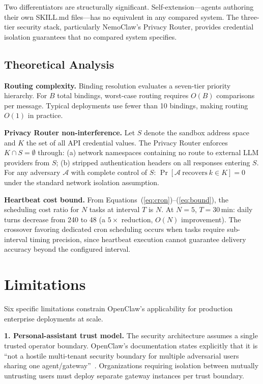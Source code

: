 \documentclass[journal]{IEEEtran}
\begin{document}
Two differentiators are structurally significant. Self-extension---agents
authoring their own SKILL.md files---has no equivalent in any compared system.
The three-tier security stack, particularly NemoClaw's Privacy Router, provides
credential isolation guarantees that no compared system specifies.

\subsection{Theoretical Analysis}

\textbf{Routing complexity.} Binding resolution evaluates a seven-tier priority
hierarchy. For $B$ total bindings, worst-case routing requires $O(B)$
comparisons per message. Typical deployments use fewer than 10 bindings,
making routing $O(1)$ in practice.

\textbf{Privacy Router non-interference.} Let $S$ denote the sandbox address
space and $K$ the set of all API credential values. The Privacy Router enforces
$K \cap S = \emptyset$ through: (a) network namespaces containing no route to
external LLM providers from $S$; (b) stripped authentication headers on all
responses entering $S$. For any adversary $\mathcal{A}$ with complete control
of $S$: $\Pr[\mathcal{A}\ \text{recovers}\ k \in K] = 0$ under the standard
network isolation assumption.

\textbf{Heartbeat cost bound.} From Equations~(\ref{eq:cron})--(\ref{eq:bound}),
the scheduling cost ratio for $N$ tasks at interval $T$ is $N$. At $N=5$,
$T=30$\,min: daily turns decrease from 240 to 48 (a $5\times$ reduction,
$O(N)$ improvement). The crossover favoring dedicated cron scheduling occurs
when tasks require sub-interval timing precision, since heartbeat execution
cannot guarantee delivery accuracy beyond the configured interval.

\section{Limitations}

Six specific limitations constrain OpenClaw's applicability for production
enterprise deployments at scale.

\textbf{1. Personal-assistant trust model.} The security architecture assumes
a single trusted operator boundary. OpenClaw's documentation states explicitly
that it is ``not a hostile multi-tenant security boundary for multiple
adversarial users sharing one agent/gateway''~\cite{openclaw2024docs}.
Organizations requiring isolation between mutually untrusting users must deploy
separate gateway instances per trust boundary.
\end{document}
